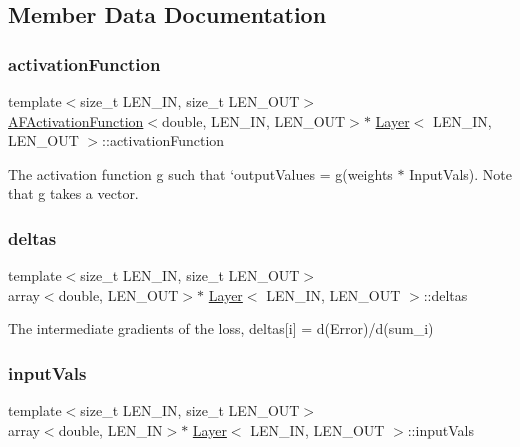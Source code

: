 \subsection{Member Data Documentation}
\mbox{\label{class_layer_aa986af731d3638fe75d0fd93e3481386}} 
\subsubsection{\texorpdfstring{activation\+Function}{activationFunction}}
{\footnotesize\ttfamily template$<$size\+\_\+t L\+E\+N\+\_\+\+IN, size\+\_\+t L\+E\+N\+\_\+\+O\+UT$>$ \\
\hyperlink{class_a_f_activation_function}{A\+F\+Activation\+Function}$<$double, L\+E\+N\+\_\+\+IN, L\+E\+N\+\_\+\+O\+UT$>$$\ast$ \hyperlink{class_layer}{Layer}$<$ L\+E\+N\+\_\+\+IN, L\+E\+N\+\_\+\+O\+UT $>$\+::activation\+Function}



The activation function {\ttfamily g} such that `output\+Values = g(weights $\ast$ Input\+Vals). Note that g takes a vector. 

\mbox{\label{class_layer_aeefbb274f205f4960c4a1a3ed5f5d807}} 
\subsubsection{\texorpdfstring{deltas}{deltas}}
{\footnotesize\ttfamily template$<$size\+\_\+t L\+E\+N\+\_\+\+IN, size\+\_\+t L\+E\+N\+\_\+\+O\+UT$>$ \\
array$<$double, L\+E\+N\+\_\+\+O\+UT$>$$\ast$ \hyperlink{class_layer}{Layer}$<$ L\+E\+N\+\_\+\+IN, L\+E\+N\+\_\+\+O\+UT $>$\+::deltas}



The intermediate gradients of the loss, {\ttfamily deltas\mbox{[}i\mbox{]} = d(\+Error)/d(sum\+\_\+i)} 

\mbox{\label{class_layer_a38145ae44adb77f559a0ae77dad7c6f9}} 
\subsubsection{\texorpdfstring{input\+Vals}{inputVals}}
{\footnotesize\ttfamily template$<$size\+\_\+t L\+E\+N\+\_\+\+IN, size\+\_\+t L\+E\+N\+\_\+\+O\+UT$>$ \\
array$<$double, L\+E\+N\+\_\+\+IN$>$$\ast$ \hyperlink{class_layer}{Layer}$<$ L\+E\+N\+\_\+\+IN, L\+E\+N\+\_\+\+O\+UT $>$\+::input\+Vals}



